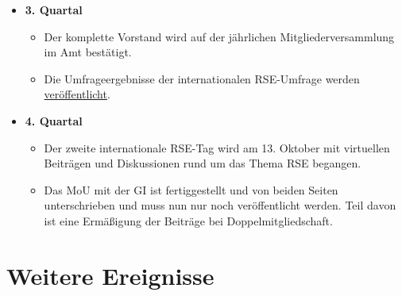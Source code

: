 \begin{itemize}
\begin{itemize}
   \end{itemize}
 \item \textbf{3. Quartal}
   \begin{itemize}
    \item Der komplette Vorstand wird auf der jährlichen Mitgliederversammlung im Amt bestätigt.
    \item Die Umfrageergebnisse der internationalen RSE-Umfrage werden \href{https://softwaresaved.github.io/international-survey-2022/}{veröffentlicht}.
   \end{itemize}
 \item \textbf{4. Quartal}
   \begin{itemize}
    \item Der zweite internationale RSE-Tag wird am 13. Oktober mit virtuellen Beiträgen und Diskussionen rund um das Thema RSE begangen.
    \item Das MoU mit der GI ist fertiggestellt und von beiden Seiten unterschrieben und muss nun nur noch veröffentlicht werden. Teil davon ist eine Ermäßigung der Beiträge bei Doppelmitgliedschaft.
   \end{itemize}
\end{itemize}

\section{Weitere Ereignisse}

